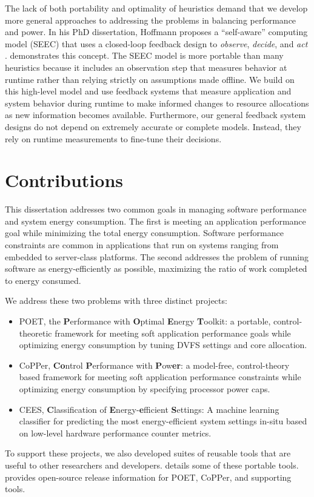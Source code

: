The lack of both portability and optimality of heuristics demand that we develop more general approaches to addressing the problems in balancing performance and power.
In his PhD dissertation, Hoffmann proposes a ``self-aware'' computing model (SEEC) that uses a closed-loop feedback design to \emph{observe}, \emph{decide}, and \emph{act} \cite{HoffmannPhD}.
 demonstrates this concept.
The SEEC model is more portable than many heuristics because it includes an observation step that measures behavior at runtime rather than relying strictly on assumptions made offline.
We build on this high-level model and use feedback systems that measure application and system behavior during runtime to make informed changes to resource allocations as new information becomes available.
Furthermore, our general feedback system designs do not depend on extremely accurate or complete models.
Instead, they rely on runtime measurements to fine-tune their decisions.


\section{Contributions}

This dissertation addresses two common goals in managing software performance and system energy consumption.
The first is meeting an application performance goal while minimizing the total energy consumption.
Software performance constraints are common in applications that run on systems ranging from embedded to server-class platforms.
The second addresses the problem of running software as energy-efficiently as possible, \ie maximizing the ratio of work completed to energy consumed.

We address these two problems with three distinct projects:
\begin{itemize}
\item POET, the \textbf{P}erformance with \textbf{O}ptimal \textbf{E}nergy \textbf{T}oolkit: a portable, control-theoretic framework for meeting soft application performance goals while optimizing energy consumption by tuning DVFS settings and core allocation.
\item CoPPer, \textbf{Co}ntrol \textbf{P}erformance with \textbf{P}ow\textbf{er}: a model-free, control-theory based framework for meeting soft application performance constraints while optimizing energy consumption by specifying processor power caps.
\item CEES, \textbf{C}lassification of \textbf{E}nergy-\textbf{e}fficient \textbf{S}ettings: A machine learning classifier for predicting the most energy-efficient system settings in-situ based on low-level hardware performance counter metrics.
\end{itemize}
To support these projects, we also developed suites of reusable tools that are useful to other researchers and developers.
 details some of these portable tools.
 provides open-source release information for POET, CoPPer, and supporting tools.


